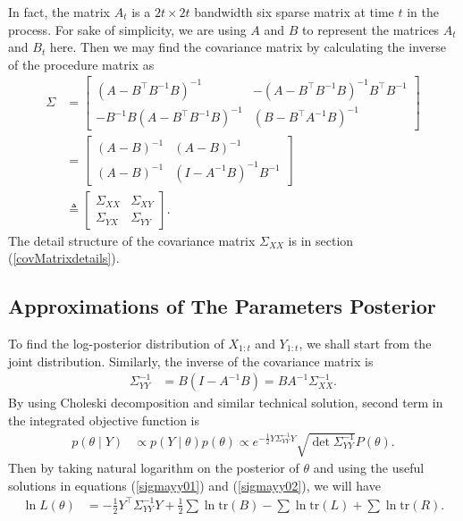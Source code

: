In fact, the matrix $A_t$ is a $2t \times 2t$ bandwidth six sparse matrix at time $t$ in the process. For sake of simplicity, we are using $A$ and $B$ to represent the matrices  $A_t$ and $B_t$ here. Then we may find the covariance matrix by calculating the inverse of the procedure matrix as 
\begin{align*}
\Sigma &= \begin{bmatrix}
(A-B^\top B^{-1}B) ^{-1} & -(A-B^\top B^{-1}B)^{-1}B^\top B^{-1}\\
- B^{-1}B(A-B^\top B^{-1}B)^{-1} & (B-B^\top A^{-1}B) ^{-1}
\end{bmatrix} \\
&= \begin{bmatrix}
(A-B) ^{-1} & (A-B)^{-1}\\
(A-B)^{-1} & (I- A^{-1}B) ^{-1}B^{-1}
\end{bmatrix} \\
&\triangleq \begin{bmatrix}
\Sigma_{XX} & \Sigma_{XY} \\
\Sigma_{YX}  &\Sigma_{YY} 
\end{bmatrix}.
\end{align*}
The detail structure of the covariance matrix $\Sigma_{XX} $ is in section (\ref{covMatrixdetails}). 

\subsection{Approximations of The Parameters Posterior}

To find the log-posterior distribution of $X_{1:t}$ and $Y_{1:t}$, we shall start from the joint distribution. Similarly, the inverse of the covariance matrix is 
\begin{align*}
\Sigma_{YY}^{-1} &= B(I-A^{-1}B)= BA^{-1}\Sigma_{XX}^{-1}.
\end{align*}
By using Choleski decomposition and similar technical solution, second term in the integrated objective function is 
\begin{align*}
p(\theta \mid Y) &\propto p(Y\mid\theta)p(\theta) \propto e^{-\frac{1}{2} Y \Sigma_{YY}^{-1} Y } \sqrt{\det \Sigma_{YY}^{-1}} P(\theta).
\end{align*}
Then by taking natural logarithm on the posterior of $\theta$ and using the useful solutions in equations (\ref{sigmayy01}) and (\ref{sigmayy02}), we will have
\begin{align}\label{logL}
\ln L(\theta) &= -\frac{1}{2}Y^\top\Sigma_{YY}^{-1}Y+\frac{1}{2}\sum\ln\mbox{tr}(B)-\sum\ln\mbox{tr}(L)+\sum\ln\mbox{tr}(R).
\end{align}





